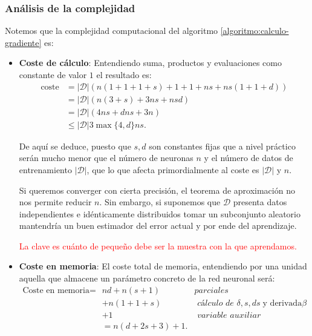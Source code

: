 \subsubsection*{Análisis de la complejidad}  
Notemos que la complejidad computacional del algoritmo  \ref{algoritmo:calculo-gradiente} es:
\begin{itemize}
    \item \textbf{Coste de cálculo}:  Entendiendo suma, productos y evaluaciones como constante de valor $1$ el resultado es: 
    \begin{align}
        \text{coste} &=
        |\mathcal{D}| 
        \left(
            n(1+1+1 + s) + 
            1+1 +
            n s 
            + n s (1 + 1 + d) 
        \right) 
        \\
        & =   
        |\mathcal{D}| 
        ( 
            n (3 + s)  
            +  3 n s
            + n s d
        ) 
        \\
        & = |\mathcal{D}|
        (
            4 n s + d n s + 3 n
        )  
        \\
        & \leq 
        |\mathcal{D}|
        3 \max \{4, d \} n s.
    \end{align} 

    De aquí se deduce, puesto que $s,d$ son constantes fijas que a nivel práctico serán mucho menor que el número de neuronas  $n$ y el número de datos de entrenamiento $|\mathcal{D}| $, que lo que afecta primordialmente al coste es $|\mathcal{D}| $ y $n$. 
    
    Si queremos converger con cierta precisión, el teorema de aproximación no nos permite reducir $n$. Sin embargo, si suponemos que $\mathcal{D}$
    presenta datos independientes e idénticamente distribuidos tomar un subconjunto aleatorio mantendría un buen estimador del error actual y por ende del aprendizaje. 

    \textcolor{red}{La clave es cuánto de pequeño debe ser la muestra con la que aprendamos.}

    \item \textbf{Coste en memoria}: 
    El coste total de memoria, entendiendo por una unidad aquella que almacene un parámetro concreto de la red neuronal será: 
    \begin{align}
        \text{Coste en memoria} = &
         n d + n (s + 1) \; &  \textit{parciales}
         \\& + n (1 + 1 + s)  \; & \textit{ cálculo de }
          \delta, s, d s \; \text{y derivada}\beta
         \\& +1 \; &  \textit{ variable auxiliar}
         \\& = n (d + 2s +3) +1.
    \end{align}
\end{itemize} 



